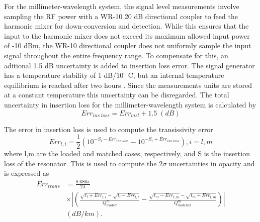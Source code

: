 For the millimeter-wavelength system, the signal level measurements involve sampling the RF power with a WR-10 20 dB directional coupler to feed the harmonic mixer for down-conversion and detection. While this ensures that the input to the harmonic mixer does not exceed its maximum allowed input power of -10 dBm, the WR-10 directional coupler does not uniformly sample the input signal throughout the entire frequency range. To compensate for this, an aditional 1.5 dB uncertainty is added to insertion loss error. The signal generator has a temperature stability of 1 dB/$10^\circ$ C, but an internal temperature equilibrium is reached after two hours \cite{Hewlett-Packard}. Since the measurements units are stored at a constant temperature this uncertainty can be disregarded. The total uncertainty in insertion loss for the millimeter-wavelength system is calculated by
\begin{equation}
Err_{ins\;loss} = Err_{msl} +1.5\;(dB)
\end{equation}

The error in insertion loss is used to compute the transissivity error
\begin{equation}
Err_{t,i} = \frac{1}{2} ( 10^{-S_i - Err_{ins\;loss}} - 10^{-S_i + Err_{ins\;loss}}) , i=l,m
\end{equation}
where l,m are the loaded and matched cases, respectively, and S is the insertion loss of the resonator. This is used to compute the $2\sigma$ uncertainties in opacity and is expressed as
\begin{equation}
\begin{split}
Err_{trans} &= \frac{8.686 \pi}{2\lambda}\\ 
 &\times \left| \left( \frac{\sqrt{t_l + Err_{t,l}}- \sqrt{t_l - Err_{t,l}}}{Q^m_{loaded}} - \frac{\sqrt{t_m - Err_{t,m}}- \sqrt{t_m + Err_{t,m}}}{Q^m_{matched}} \right) \right|\\
 &(dB/km).
\end{split}
\end{equation}

